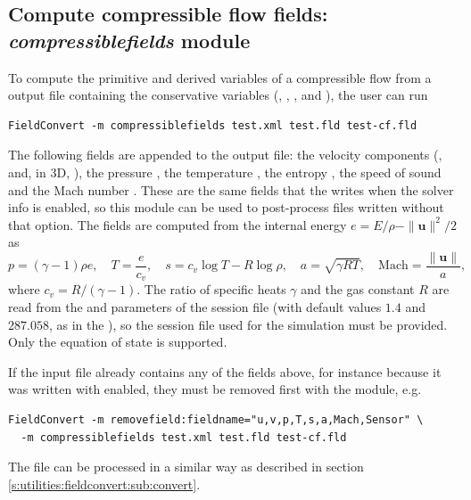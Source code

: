 \subsection{Compute compressible flow fields: \textit{compressiblefields} module}
\label{s:utilities:fieldconvert:sub:compressiblefields}
To compute the primitive and derived variables of a compressible flow from a
\nekpp output file containing the conservative variables (,
, ,  and ), the user can run
\begin{lstlisting}[style=BashInputStyle]
FieldConvert -m compressiblefields test.xml test.fld test-cf.fld
\end{lstlisting}
The following fields are appended to the output file: the velocity components
(,  and, in 3D, ), the pressure , the
temperature , the entropy , the speed of sound  and
the Mach number . These are the same fields that the
 writes when the 
solver info is enabled, so this module can be used to post-process files
written without that option. The fields are computed from the internal energy
$e = E/\rho - \|\mathbf{u}\|^2/2$ as
\begin{equation*}
p = (\gamma - 1)\rho e, \quad
T = \frac{e}{c_v}, \quad
s = c_v \log T - R \log \rho, \quad
a = \sqrt{\gamma R T}, \quad
\mathrm{Mach} = \frac{\|\mathbf{u}\|}{a},
\end{equation*}
where $c_v = R/(\gamma - 1)$. The ratio of specific heats $\gamma$ and the gas
constant $R$ are read from the  and 
parameters of the session file (with default values $1.4$ and $287.058$, as in
the ), so the session file used for the
simulation must be provided. Only the  equation of state is
supported.

If the input file already contains any of the fields above, for instance
because it was written with  enabled, they must be
removed first with the  module, e.g.
\begin{lstlisting}[style=BashInputStyle]
FieldConvert -m removefield:fieldname="u,v,p,T,s,a,Mach,Sensor" \
  -m compressiblefields test.xml test.fld test-cf.fld
\end{lstlisting}
The file  can be processed in a similar way as described
in section \ref{s:utilities:fieldconvert:sub:convert}.
%
%
%
